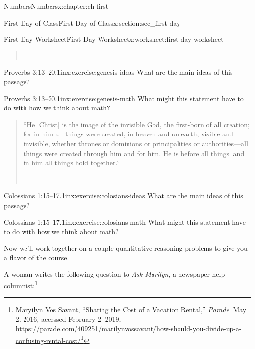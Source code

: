 \documentclass[twoside,10pt,]{book}
\numberwithin{equation}{chapter}
\begin{document}
\begin{chapterptx}{Numbers}{}{Numbers}{}{}{x:chapter:ch-first}
\begin{sectionptx}{First Day of Class}{}{First Day of Class}{}{}{x:section:sec_first-day}
\begin{worksheet-subsection}{First Day Worksheet}{}{First Day Worksheet}{}{}{x:worksheet:first-day-worksheet}
\begin{quote}
\nopagebreak\par%
\hfill{}\\\par
\end{quote}
\begin{divisionexercise}{5}{Proverbs 3:13–20.}{1in}{x:exercise:genesis-ideas}%
What are the main ideas of this passage?\end{divisionexercise}%
\begin{divisionexercise}{6}{Proverbs 3:13–20.}{1in}{x:exercise:genesis-math}%
What might this statement have to do with how we think about math?\end{divisionexercise}%
\clearpage
\begin{quote}%
``He [Christ] is the image of the invisible God, the first-born of all creation; for in him all things were created, in heaven and on earth, visible and invisible, whether thrones or dominions or principalities or authorities—all things were created through him and for him.  He is before all things, and in him all things hold together.''%
\nopagebreak\par%
\hfill{}\\\par
\end{quote}
\begin{divisionexercise}{7}{Colossians 1:15–17.}{1in}{x:exercise:colosians-ideas}%
What are the main ideas of this passage?\end{divisionexercise}%
\begin{divisionexercise}{8}{Colossians 1:15–17.}{1in}{x:exercise:colosians-math}%
What might this statement have to do with how we think about math?\end{divisionexercise}%
Now we'll work together on a couple quantitative reasoning problems to give you a flavor of the course.%
\par
A woman writes the following question to \emph{Ask Marilyn}, a newspaper help columnist:\footnote{Maryilyn Vos Savant, ``Sharing the Cost of a Vacation Rental,'' \emph{Parade}, May 2, 2016, accessed February 2, 2019, \href{}{https:\slash{}\slash{}parade.com\slash{}409251\slash{}marilynvossavant\slash{}how-should-you-divide-up-a-confusing-rental-cost\slash{}}\footnote{\nolinkurl{}\label{g:fn:idp1847878376}}\label{g:fn:idp1847866472}}%

\end{worksheet-subsection}
\end{sectionptx}
\end{chapterptx}
\end{document}
